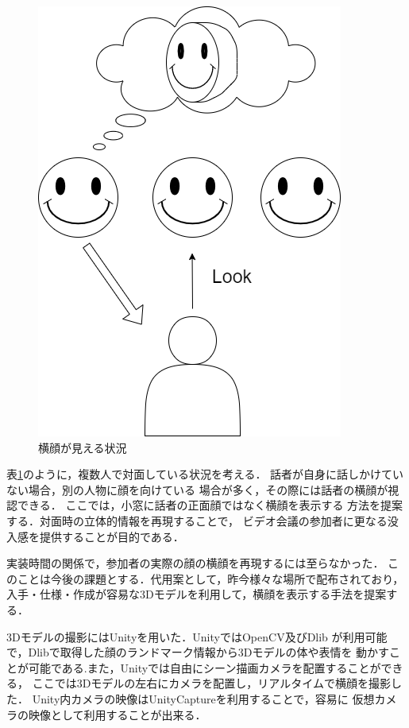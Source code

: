 \begin{figure}[tp]
  \centering
  \includegraphics[scale=0.7]{fig/yokogao.png}
  \caption{横顔が見える状況} \label{yokogao}
\end{figure}

表\ref{yokogao}のように，複数人で対面している状況を考える．
話者が自身に話しかけていない場合，別の人物に顔を向けている
場合が多く，その際には話者の横顔が視認できる．
ここでは，小窓に話者の正面顔ではなく横顔を表示する
方法を提案する．対面時の立体的情報を再現することで，
ビデオ会議の参加者に更なる没入感を提供することが目的である．

実装時間の関係で，参加者の実際の顔の横顔を再現するには至らなかった．
このことは今後の課題とする．代用案として，昨今様々な場所で配布されており，
入手・仕様・作成が容易な3Dモデルを利用して，横顔を表示する手法を提案する．

3Dモデルの撮影にはUnity\cite{16}を用いた．UnityではOpenCV及びDlib
が利用可能で，Dlibで取得した顔のランドマーク情報から3Dモデルの体や表情を
動かすことが可能である.また，Unityでは自由にシーン描画カメラを配置することができる，
ここでは3Dモデルの左右にカメラを配置し，リアルタイムで横顔を撮影した．
Unity内カメラの映像はUnityCapture\cite{8}を利用することで，容易に
仮想カメラの映像として利用することが出来る．

